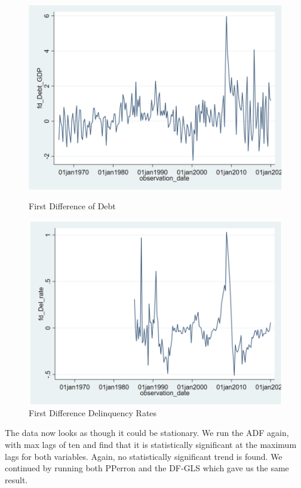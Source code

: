 \documentclass[11pt, oneside]{article}   	%
\begin{document}
\begin{figure}[h]
\centering
\begin{minipage}{.5\textwidth}
  \centering
  \includegraphics[width=.8\linewidth]{fd_debt}
  \caption{First Difference of Debt}
  \label{fig:test1}
\end{minipage}%
\begin{minipage}{.5\textwidth}
  \centering
  \includegraphics[width=.8\linewidth]{fd_rates}
  \caption{First Difference Delinquency Rates}
  \label{fig:test2}
\end{minipage}
\end{figure}


The data now looks as though it could be stationary. We run the ADF again, with max lags of ten and find that it is statistically significant at the maximum lags for both variables. Again, no statistically significant trend is found. We continued by running both PPerron and the DF-GLS which gave us the same result. 
\end{document}
